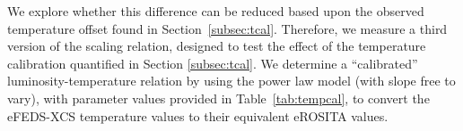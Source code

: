 \documentclass[fleqn,usenatbib]{mnras}
\begin{document}


We explore whether this difference can be reduced based upon the observed temperature offset found in Section~\ref{subsec:tcal}.  Therefore, we measure a third version of the scaling relation, designed to test the effect of the temperature calibration quantified in Section \ref{subsec:tcal}.  We determine a ``calibrated'' luminosity-temperature relation by using the power law model (with slope free to vary), with parameter values provided in Table~\ref{tab:tempcal}, to convert the eFEDS-XCS temperature values to their equivalent eROSITA values.
\end{document}
